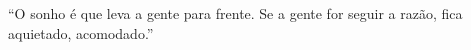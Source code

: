 ``O sonho é que leva a gente para frente. Se a gente for seguir a razão, fica aquietado, acomodado.''


